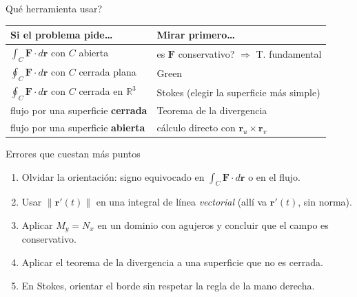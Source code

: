 \documentclass[11pt,aspectratio=169]{beamer}
\begin{document}
\begin{frame}{\textquestiondown{}Qué herramienta usar?}
  \begin{center}
  \renewcommand{\arraystretch}{1.4}
  \small
  \begin{tabular}{ll}
    \toprule
    \textbf{Si el problema pide\ldots} & \textbf{Mirar primero\ldots}\\
    \midrule
    $\int_C \mathbf F\cdot d\mathbf r$ con $C$ abierta
      & \textquestiondown{}es $\mathbf F$ conservativo? $\Rightarrow$ T. fundamental\\
    $\oint_C \mathbf F\cdot d\mathbf r$ con $C$ cerrada plana
      & Green\\
    $\oint_C \mathbf F\cdot d\mathbf r$ con $C$ cerrada en $\mathbb R^3$
      & Stokes (elegir la superficie más simple)\\
    flujo por una superficie \textbf{cerrada}
      & Teorema de la divergencia\\
    flujo por una superficie \textbf{abierta}
      & cálculo directo con $\mathbf r_u\times\mathbf r_v$\\
    \bottomrule
  \end{tabular}
  \end{center}
  \vspace{8pt}
  \pause
\end{frame}

\begin{frame}{Errores que cuestan más puntos}
  \begin{enumerate}
    \setlength{\itemsep}{6pt}
    \item Olvidar la orientación: signo equivocado en $\int_C\mathbf F\cdot d\mathbf r$ o en el flujo.
    \pause
    \item Usar $\|\mathbf r'(t)\|$ en una integral de línea \emph{vectorial} (allí va $\mathbf r'(t)$, sin norma).
    \pause
    \item Aplicar $M_y=N_x$ en un dominio con agujeros y concluir que el campo es conservativo.
    \pause
    \item Aplicar el teorema de la divergencia a una superficie que no es cerrada.
    \pause
    \item En Stokes, orientar el borde sin respetar la regla de la mano derecha.
  \end{enumerate}
\end{frame}
\end{document}
